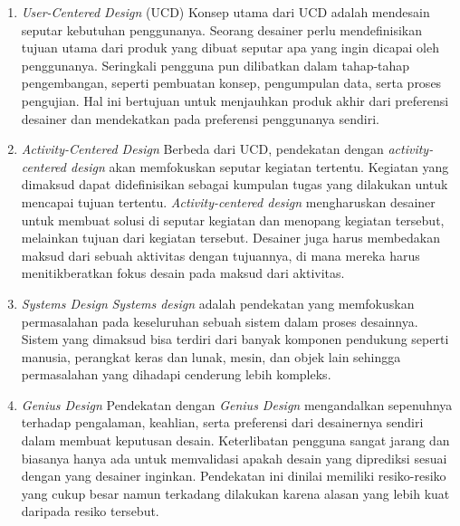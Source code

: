 \begin{enumerate}
  \item \textit{User-Centered Design} (UCD)
  \subitem Konsep utama dari UCD adalah mendesain seputar kebutuhan penggunanya. Seorang desainer perlu mendefinisikan tujuan utama dari produk yang dibuat seputar apa yang ingin dicapai oleh penggunanya. Seringkali pengguna pun dilibatkan dalam tahap-tahap pengembangan, seperti pembuatan konsep, pengumpulan data, serta proses pengujian. Hal ini bertujuan untuk menjauhkan produk akhir dari preferensi desainer dan mendekatkan pada preferensi penggunanya sendiri. \parencite{saffer2010designing} 
   
  \item \textit{Activity-Centered Design}
  \subitem Berbeda dari UCD, pendekatan dengan \textit{activity-centered design} akan memfokuskan seputar kegiatan tertentu. Kegiatan yang dimaksud dapat didefinisikan sebagai kumpulan tugas yang dilakukan untuk mencapai tujuan tertentu. \textit{Activity-centered design} mengharuskan desainer untuk membuat solusi di seputar kegiatan dan menopang kegiatan tersebut, melainkan tujuan dari kegiatan tersebut. Desainer juga harus membedakan maksud dari sebuah aktivitas dengan tujuannya, di mana mereka harus menitikberatkan fokus desain pada maksud dari aktivitas. \parencite{saffer2010designing}
 
  \item \textit{Systems Design}
  \subitem \textit{Systems design} adalah pendekatan yang memfokuskan permasalahan pada keseluruhan sebuah sistem dalam proses desainnya. Sistem yang dimaksud bisa terdiri dari banyak komponen pendukung seperti manusia, perangkat keras dan lunak, mesin, dan objek lain sehingga permasalahan yang dihadapi cenderung lebih kompleks. \parencite{saffer2010designing}
 
  \item \textit{Genius Design}
  \subitem Pendekatan dengan \textit{Genius Design} mengandalkan sepenuhnya terhadap pengalaman, keahlian, serta preferensi dari desainernya sendiri dalam membuat keputusan desain. Keterlibatan pengguna sangat jarang dan biasanya hanya ada untuk memvalidasi apakah desain yang diprediksi sesuai dengan yang desainer inginkan. Pendekatan ini dinilai memiliki resiko-resiko yang cukup besar namun terkadang dilakukan karena alasan yang lebih kuat daripada resiko tersebut. \parencite{saffer2010designing}
 
\end{enumerate}

